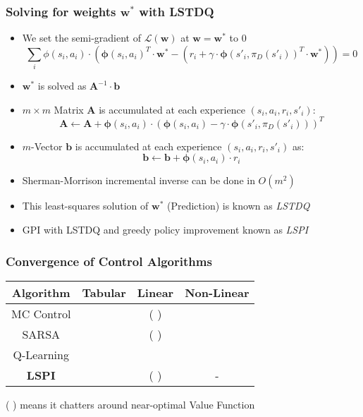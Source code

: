 \documentclass[handout]{beamer}
\newcommand{\cmark}{\ding{51}}%
\newcommand{\xmark}{\ding{55}}%
\begin{document}
\begin{frame}
\frametitle{Solving for weights $\bm{w}^*$ with LSTDQ}
\pause
\begin{itemize}[<+->]
\item We set the semi-gradient of $\mathcal{L}(\bm{w})$ at $\bm{w} = \bm{w}^*$ to 0
\begin{equation}
\sum_i \phi(s_i,a_i) \cdot (\bm{\phi}(s_i,a_i)^T \cdot \bm{w}^* - (r_i + \gamma \cdot \bm{\phi}(s'_i, \pi_D(s'_i))^T \cdot \bm{w}^*)) = 0
\label{eq:lspi-loss-semi-gradient}
\end{equation}
\item $\bm{w}^*$ is solved as $\bm{A}^{-1} \cdot \bm{b}$
\item $m \times m$ Matrix $\bm{A}$ is accumulated at each experience $(s_i,a_i,r_i,s'_i)$:
$$ \bm{A} \leftarrow \bm{A} + \bm{\phi}(s_i, a_i) \cdot (\bm{\phi}(s_i, a_i) - \gamma \cdot \bm{\phi}(s'_i, \pi_D(s'_i)))^T $$
\item $m$-Vector $\bm{b}$ is accumulated at each experience $(s_i,a_i,r_i,s'_i)$ as:
$$\bm{b} \leftarrow \bm{b} + \bm{\phi}(s_i, a_i) \cdot r_i$$
\item Sherman-Morrison incremental inverse can be done in $O(m^2)$
\item This least-squares solution of $\bm{w}^*$ (Prediction) is known as {\em LSTDQ}
\item GPI with LSTDQ and greedy policy improvement known as {\em LSPI}
\end{itemize}
\end{frame}

\begin{frame}
\frametitle{Convergence of Control Algorithms}
\pause
\begin{center}
      \begin{tabular}{cccc}
      \hline
      Algorithm & Tabular & Linear & Non-Linear \\ \hline
      MC Control & \cmark & ( \cmark ) & \xmark \\
      SARSA & \cmark & ( \cmark ) & \xmark \\ 
      Q-Learning & \cmark & \xmark & \xmark \\
      {\bf LSPI} & \cmark & ( \cmark ) & - \\ \hline
      \end{tabular}
 \end{center}     
  \pause
  ( \cmark ) means it chatters around near-optimal Value Function   
\end{frame}
\end{document}
